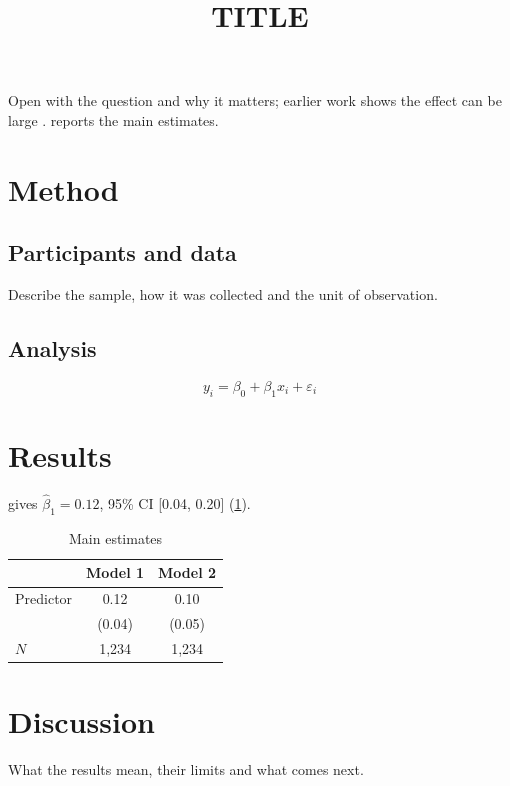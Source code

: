 \documentclass[man,12pt,natbib]{apa7}
\title{{{TITLE}}}
\begin{document}
\maketitle

Open with the question and why it matters; earlier work shows the effect can be large \citep{card1994minimum,imbens2008regression}.  reports the main estimates.

\section{Method}\label{sec:method}
\subsection{Participants and data}
Describe the sample, how it was collected and the unit of observation.

\subsection{Analysis}
\begin{equation}\label{eq:main}
  y_{i} = \beta_0 + \beta_1 x_{i} + \varepsilon_{i}
\end{equation}

\section{Results}\label{sec:results}
 gives $\hat\beta_1 = 0.12$, 95\% CI [0.04, 0.20] (\cref{tab:main}).

\begin{table}[t]
  \caption{Main estimates}\label{tab:main}
  \begin{tabular}{lcc}
    \toprule
    & Model 1 & Model 2 \\
    \midrule
    Predictor & 0.12 & 0.10 \\
              & (0.04) & (0.05) \\
    \midrule
    $N$ & 1{,}234 & 1{,}234 \\
    \bottomrule
  \end{tabular}
\end{table}

\section{Discussion}\label{sec:discussion}
What the results mean, their limits and what comes next.


\end{document}
